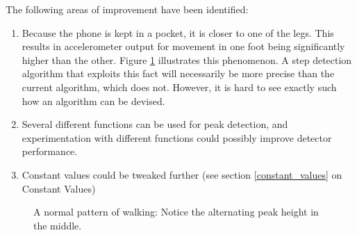 The following areas of improvement have been identified:
\begin{enumerate}
\item Because the phone is kept in a pocket, it is closer to one of the legs. This results in accelerometer output for movement in one foot being significantly higher than the other. Figure \ref{fig:FilipWalks} illustrates this phenomenon. A step detection algorithm that exploits this fact will necessarily be more precise than the current algorithm, which does not. However, it is hard to see exactly such how an algorithm can be devised.
\item Several different functions can be used for peak detection, and experimentation with different functions could possibly improve detector performance.
\item Constant values could be tweaked further (see section \ref{constant_values} on Constant Values)
\end{enumerate}

\begin{figure}[p]

\setlength\fboxsep{0pt}
\setlength\fboxrule{1pt}\noindent{}

\caption{A normal pattern of walking: Notice the alternating peak height in the middle.}
\label{fig:FilipWalks}
\end{figure}